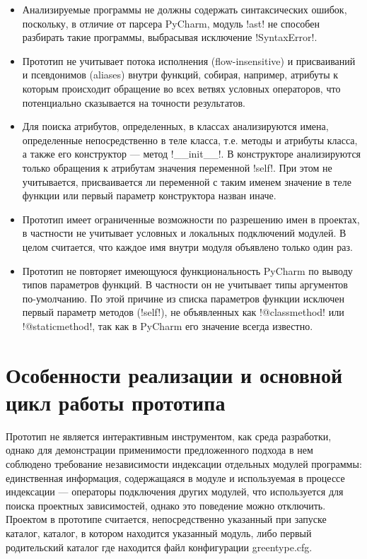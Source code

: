 \begin{itemize} 
  \item Анализируемые программы не должны содержать синтаксических
  ошибок, поскольку, в отличие от парсера PyCharm, модуль !ast! не способен
  разбирать такие программы, выбрасывая исключение !SyntaxError!.

  \item Прототип не учитывает потока исполнения (flow-insensitive) и
    присваиваний и псевдонимов (aliases) внутри функций, собирая, например,
    атрибуты к которым происходит обращение во всех ветвях условных операторов,
    что потенциально сказывается на точности результатов.

  \item Для поиска атрибутов, определенных, в классах анализируются имена,
    определенные непосредственно в теле класса, т.е. методы и атрибуты
    класса, а также его конструктор --- метод !__init__!. В конструкторе
    анализируются только обращения к атрибутам значения переменной !self!. 
    При этом не учитывается, присваивается ли переменной с таким именем значение
    в теле функции или первый параметр конструктора назван иначе.

  \item Прототип имеет ограниченные возможности по разрешению имен в проектах, в
    частности не учитывает условных и локальных подключений модулей. В целом
    считается, что каждое имя внутри модуля объявлено только один раз.

  \item Прототип не повторяет имеющуюся функциональность PyCharm по выводу
    типов параметров функций. В частности он не учитывает типы
    аргументов по-умолчанию. По этой причине из списка параметров функции
    исключен первый параметр методов (!self!), не объявленных как !@classmethod!
    или !@staticmethod!, так как в PyCharm его значение всегда известно.

\end{itemize}



\section{Особенности реализации и основной цикл работы прототипа}
\label{sec:prototype-architecture}

Прототип не является интерактивным инструментом, как среда разработки, однако
для демонстрации применимости предложенного подхода в нем соблюдено требование
независимости индексации отдельных модулей программы: единственная информация,
содержащаяся в модуле и используемая в процессе индексации --- операторы
подключения других модулей, что используется для поиска проектных зависимостей,
однако это поведение можно отключить. Проектом в прототипе считается,
непосредственно указанный при запуске каталог, каталог, в котором находится
указанный модуль, либо первый родительский каталог где находится файл
конфигурации greentype.cfg.

